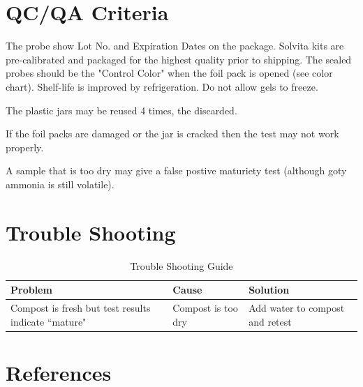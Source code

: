 \documentclass[12pt]{../SOP4_alpha}\usepackage[]{graphicx}\usepackage[]{xcolor}
\begin{document}
\section{QC/QA Criteria}

\NP The probe show Lot No. and Expiration Dates on the package. Solvita kits are pre-calibrated and packaged for the highest quality prior to shipping. The sealed probes should be the "Control Color" when the foil pack is opened (see color chart).  Shelf-life is improved by refrigeration. Do not allow gels to freeze. 

\NP The plastic jars may be reused 4 times, the discarded. 

\NP If the foil packs are damaged or the jar is cracked then the test may not work properly.

\NP A sample that is too dry may give a false postive maturiety test (although goty ammonia is still volatile).

\section{Trouble Shooting}

\begin{table}[ht]
\centering
\caption{Trouble Shooting Guide}
\begin{tabular}{p{5cm}p{5cm}p{5cm}} \hline
\textbf{Problem} & \textbf{Cause} & \textbf{Solution} \\ \hline \hline
Compost is fresh but test results indicate ``mature"& 
Compost is too dry & 
Add water to compost and retest \\


\end{tabular}
\end{table}

\section{References}




\end{document}
